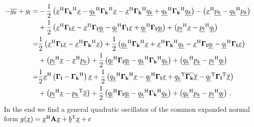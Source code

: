 \documentclass[a4paper,10pt]{article}
\begin{document}
\begin{equation*}
\begin{split}
 -\conj{g_k} + g_l
 = &
 -\frac{1}{2} \left(
               \vec{x}\H \mat{\Gamma_k}\H \vec{x}
              -\vec{q_k}\H \mat{\Gamma_k}\H \vec{x}
              -\vec{x}\H \mat{\Gamma_k}\H \vec{q_k}
              +\vec{q_k}\H \mat{\Gamma_k}\H \vec{q_k}
              \right)
 - \left(\vec{x}\H \vec{p_k} - \vec{q_k}\H \vec{p_k}\right) \\
 & +
  \frac{1}{2} \left(
                \vec{x}\H \mat{\Gamma_l} \vec{x}
               -\vec{x}\H \mat{\Gamma_l} \vec{q_l}
               -\vec{q_l}\H \mat{\Gamma_l} \vec{x}
               +\vec{q_l}\H \mat{\Gamma_l} \vec{q_l}
              \right)
 + \left(\vec{p_l}\H \vec{x} - \vec{p_l}\H \vec{q_l}\right) \\
 = &
 \frac{1}{2} \left(\vec{x}\H \mat{\Gamma_l} \vec{x} - \vec{x}\H \mat{\Gamma_k}\H \vec{x}\right)
 +
 \frac{1}{2} \left(
               \vec{q_k}\H \mat{\Gamma_k}\H \vec{x}
              +\vec{x}\H \mat{\Gamma_k}\H \vec{q_k}
              -\vec{x}\H \mat{\Gamma_l} \vec{q_l}
              -\vec{q_l}\H \mat{\Gamma_l} \vec{x}
             \right) \\
 & +
 \left(\vec{p_l}\H \vec{x} - \vec{x}\H \vec{p_k}\right)
 + \frac{1}{2} \left(
                 \vec{q_l}\H \mat{\Gamma_l} \vec{q_l}
                -\vec{q_k}\H \mat{\Gamma_k}\H \vec{q_k}
               \right)
 + \left(\vec{q_k}\H \vec{p_k} - \vec{p_l}\H \vec{q_l}\right) \\
 = &
 \frac{1}{2} \vec{x}\H \left(\mat{\Gamma_l} - \mat{\Gamma_k}\H\right) \vec{x}
 + \frac{1}{2} \left(
                 \vec{q_k}\H \mat{\Gamma_k}\H \vec{x}
                -\vec{q_l}\H \mat{\Gamma_l} \vec{x}
                +\vec{q_k}\T \conj{\mat{\Gamma_k}} \conj{\vec{x}}
                -\vec{q_l}\T \mat{\Gamma_l}\T \conj{\vec{x}}
               \right) \\
 & +
 \left(\vec{p_l}\H \vec{x} - \vec{p_k}\T \conj{\vec{x}}\right)
 + \frac{1}{2} \left(
                 \vec{q_l}\H \mat{\Gamma_l} \vec{q_l}
                -\vec{q_k}\H \mat{\Gamma_k}\H \vec{q_k}
               \right)
 + \left(\vec{q_k}\H \vec{p_k} - \vec{p_l}\H \vec{q_l}\right) \,.
\end{split}
\end{equation*}
In the end we find a general quadratic oscillator of the common expanded
normal form
$g(\vec{x}) = \vec{x}\H \mat{A} \vec{x} + \vec{b}\T \vec{x} + c$
\end{document}
